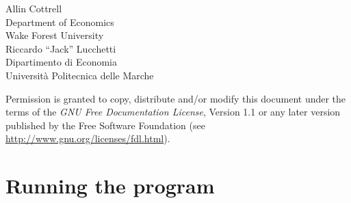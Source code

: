 \documentclass[oneside]{book}
\begin{document}
\VerbatimFootnotes

\setlength{\parindent}{0pt}
\setlength{\parskip}{1ex}
\setcounter{tocdepth}{1}


\thispagestyle{empty}

\begin{center}



{\large \sffamily
Allin Cottrell\\
Department of Economics\\
Wake Forest University\\

\vspace{20pt}
Riccardo ``Jack'' Lucchetti\\
Dipartimento di Economia\\
Università Politecnica delle Marche\\

\vspace{20pt}

}

\end{center}
\clearpage


\thispagestyle{empty}


\vspace*{2in}

Permission is granted to copy, distribute and/or modify this document
under the terms of the \emph{GNU Free Documentation License}, Version
1.1 or any later version published by the Free Software Foundation
(see \url{http://www.gnu.org/licenses/fdl.html}).

\clearpage


\pagestyle{headings}

\tableofcontents

\clearpage
{}


\part{Running the program}
\end{document}
